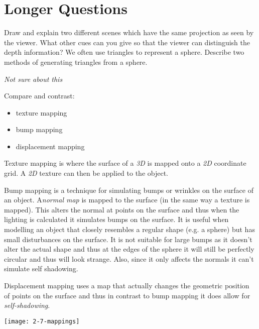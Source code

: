 \documentclass{supervision}
\begin{document}
\section*{Longer Questions}
\begin{questions}
    \question
    Draw and explain two different scenes which have the same projection as
seen by the viewer. What other cues can you give so that the viewer can distinguish the depth information?
    \question
    We often use triangles to represent a sphere. Describe two methods of generating triangles from a sphere.
    \begin{solution}
    \textit{Not sure about this}
    \end{solution}
    \question
    Compare and contrast:
    \begin{itemize}
        \item{texture mapping}
        \item{bump mapping}
        \item{displacement mapping}
    \end{itemize}
    \begin{solution}
    Texture mapping is where the surface of a \textit{3D} is mapped onto a \textit{2D} coordinate grid. A \textit{2D} texture can then be applied to the object.
    
    Bump mapping is a technique for simulating bumps or wrinkles on the surface of an object. A\textit{normal map} is mapped to the surface (in the same way a texture is mapped). This alters the normal at points on the surface and thus when the lighting is calculated it simulates bumps on the surface. It is useful when modelling an object that closely resembles a regular shape (e.g. a sphere) but has small disturbances on the surface. It is not suitable for large bumps as it doesn't alter the actual shape and thus at the edges of the sphere it will still be perfectly circular and thus will look strange. Also, since it only affects the normals it can't simulate self shadowing.
    
    Displacement mapping uses a map that actually changes the geometric position of points on the surface and thus in contrast to bump mapping it does allow for \textit{self-shadowing}.
    \begin{center}
        \texttt{[image: 2-7-mappings]}
    \end{center}
    \end{solution}


\end{questions}
\end{document}
